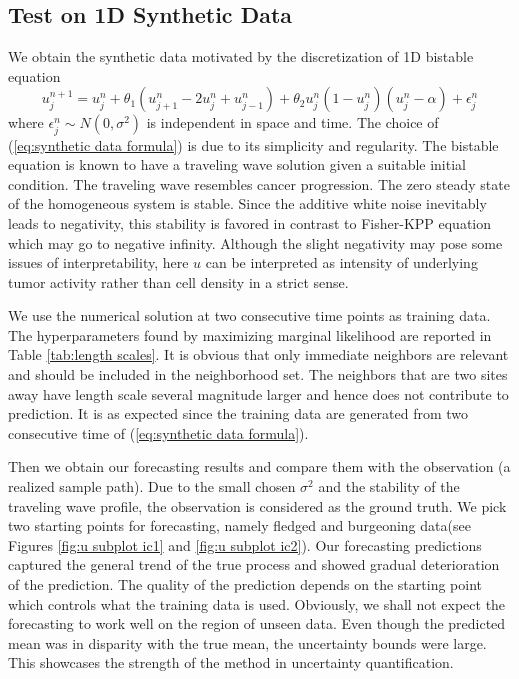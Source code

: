 \documentclass[11pt, reqno]{amsart}
\begin{document}
\subsection{Test on 1D Synthetic Data}
\label{sec:GP1d}
We obtain the synthetic data motivated by the discretization of 1D bistable equation
\begin{equation}
u_{j}^{n+1}=u_{j}^{n}+\theta_{1}(u_{j+1}^{n}-2u_{j}^{n}+u_{j-1}^{n})+\theta_{2}u_{j}^{n}(1-u_{j}^{n})(u_{j}^{n}-\alpha)+\epsilon_{j}^{n}\label{eq:synthetic data formula}
\end{equation}
where $\epsilon_{j}^{n}\sim N(0,\sigma^{2})$ is independent in space and time. The choice of (\ref{eq:synthetic data formula}) is due to its simplicity and regularity. The bistable equation is known to have a traveling wave solution given a suitable initial condition. The traveling wave resembles cancer progression. The zero steady state of the homogeneous system is stable. Since the additive white noise inevitably leads to negativity, this stability is favored in contrast to Fisher-KPP equation which may go to negative infinity. Although the slight negativity may pose some issues of interpretability, here $u$ can be interpreted as intensity of underlying tumor activity rather than cell density in a strict sense.           

We use the numerical solution at two consecutive time points as training data. The hyperparameters found by maximizing marginal likelihood are reported in Table \ref{tab:length scales}. It is obvious that only immediate neighbors are relevant and should be included in the neighborhood set. The neighbors that are two sites away have length scale several magnitude larger and hence does not contribute to prediction. It is as expected since the training data are generated from two consecutive time of (\ref{eq:synthetic data formula}).     

Then we obtain our forecasting results and compare them with the observation (a realized sample path). Due to the small chosen $\sigma^2$ and the stability of the traveling wave profile, the observation is considered as the ground truth.  We pick two starting points for forecasting, namely fledged and burgeoning data(see Figures \ref{fig:u subplot ic1} and \ref{fig:u subplot ic2}). Our forecasting predictions captured the general trend of the true process and showed gradual deterioration of the prediction. The quality of the prediction depends on the starting point which controls what the training data is used. Obviously, we shall not expect the forecasting to work well on the region of unseen data. Even though the predicted mean was in disparity with the true mean, the uncertainty bounds were large. This showcases the strength of the method in uncertainty quantification. 
\end{document}
